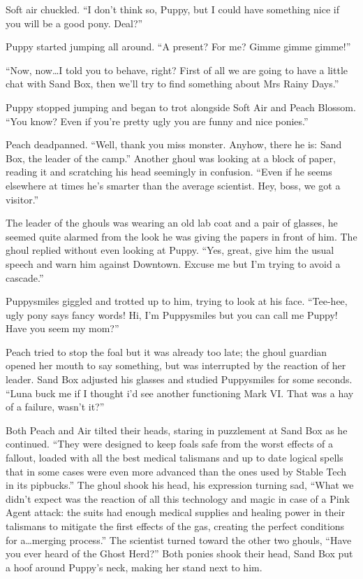 Soft air chuckled. ``I don't think so, Puppy, but I could have something nice if you will be a good pony. Deal?''

Puppy started jumping all around. ``A present? For me? Gimme gimme gimme!''

``Now, now\dots I told you to behave, right? First of all we are going to have a little chat with Sand Box, then we'll try to find something about Mrs Rainy Days.''

Puppy stopped jumping and began to trot alongside Soft Air and Peach Blossom. ``You know? Even if you're pretty ugly you are funny and nice ponies.''

Peach deadpanned. ``Well, thank you miss monster. Anyhow, there he is: Sand Box, the leader of the camp.'' Another ghoul was looking at a block of paper, reading it and scratching his head seemingly in confusion. ``Even if he seems elsewhere at times he's smarter than the average scientist. Hey, boss, we got a visitor.''

The leader of the ghouls was wearing an old lab coat and a pair of glasses, he seemed quite alarmed from the look he was giving the papers in front of him. The ghoul replied without even looking at Puppy. ``Yes, great, give him the usual speech and warn him against Downtown. Excuse me but I'm trying to avoid a cascade.''

Puppysmiles giggled and trotted up to him, trying to look at his face. ``Tee-hee, ugly pony says fancy words! Hi, I'm Puppysmiles but you can call me Puppy! Have you seem my mom?''

Peach tried to stop the foal but it was already too late; the ghoul guardian opened her mouth to say something, but was interrupted by the reaction of her leader. Sand Box adjusted his glasses and studied Puppysmiles for some seconds. ``Luna buck me if I thought i'd see another functioning Mark VI. That was a hay of a failure, wasn't it?''

Both Peach and Air tilted their heads, staring in puzzlement at Sand Box as he continued. ``They were designed to keep foals safe from the worst effects of a fallout, loaded with all the best medical talismans and up to date logical spells that in some cases were even more advanced than the ones used by Stable Tech in its pipbucks.'' The ghoul shook his head, his expression turning sad, ``What we didn't expect was the reaction of all this technology and magic in case of a Pink Agent attack: the suits had enough medical supplies and healing power in their talismans to mitigate the first effects of the gas, creating the perfect conditions for a\dots merging process.'' The scientist turned toward the other two ghouls, ``Have you ever heard of the Ghost Herd?'' Both ponies shook their head, Sand Box put a hoof around Puppy's neck, making her stand next to him.


